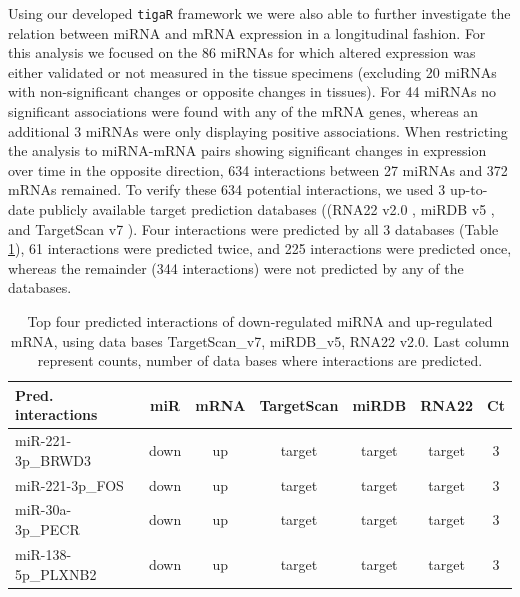 Using our developed {\tt tigaR} framework we were also able to further investigate the relation between miRNA and mRNA expression in a longitudinal fashion. For this analysis we focused on the 86 miRNAs for which altered expression was either validated or not measured in the tissue specimens (excluding 20 miRNAs with non-significant changes or opposite changes in tissues). For 44 miRNAs no significant associations were found with any of the mRNA genes, whereas an additional 3 miRNAs were only displaying positive associations. When restricting the analysis to miRNA-mRNA pairs showing significant changes in expression over time in the opposite direction, 634 interactions between 27 miRNAs and 372 mRNAs remained. To verify these 634 potential interactions, we used 3 up-to-date publicly available target prediction databases ((RNA22 v2.0 \cite{Miranda2006}, miRDB v5 \cite{Wong2015}, and TargetScan v7 \cite{Agarwal2015}). Four interactions were predicted by all 3 databases (Table \ref{table:table3}), 61 interactions were predicted twice, and 225 interactions were predicted once, whereas the remainder (344 interactions) were not predicted by any of the databases. %

\begin{table}[htbp]
  \centering
  \caption{Top four predicted interactions of down-regulated miRNA and up-regulated mRNA, using data bases TargetScan\_v7, miRDB\_v5, RNA22 v2.0. Last column represent counts, number of data bases where interactions are predicted.}
    \begin{tabular}{lcccccc}
   \hline
    \hline
    \textbf{Pred. interactions} & \textbf{miR} & \textbf{mRNA} & \textbf{TargetScan} & \textbf{miRDB} & \textbf{RNA22} & \textbf{Ct} \\
    \hline
    miR-221-3p\_BRWD3 & down  & up    & target & target & target & 3 \\
    miR-221-3p\_FOS & down  & up    & target & target & target & 3 \\
    miR-30a-3p\_PECR & down  & up    & target & target & target & 3 \\
    miR-138-5p\_PLXNB2 & down  & up    & target & target & target & 3 \\
    \hline
    \hline
    \end{tabular}%
  \label{table:table3}%
\end{table}%

